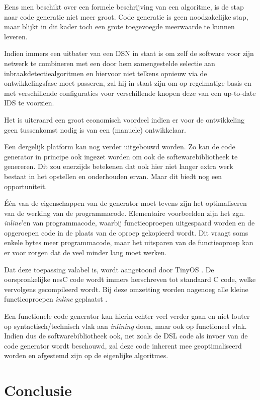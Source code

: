 Eens men beschikt over een formele beschrijving van een algoritme, is de stap
naar code generatie niet meer groot. Code generatie is geen noodzakelijke stap,
maar blijkt in dit kader toch een grote toegevoegde meerwaarde te kunnen
leveren.

Indien immers een uitbater van een DSN in staat is om zelf de software voor
zijn netwerk te combineren met een door hem samengestelde selectie aan
inbraakdetectiealgoritmen en hiervoor niet telkens opnieuw via de
ontwikkelingsfase moet passeren, zal hij in staat zijn om op regelmatige basis
en met verschillende configuraties voor verschillende knopen deze van een
up-to-date IDS te voorzien.

Het is uiteraard een groot economisch voordeel indien er voor de ontwikkeling
geen tussenkomst nodig is van een (manuele) ontwikkelaar.

Een dergelijk platform kan nog verder uitgebouwd worden. Zo kan de code
generator in principe ook ingezet worden om ook de softewarebibliotheek te
genereren. Dit zou enerzijds betekenen dat ook hier niet langer extra werk
bestaat in het opstellen en onderhouden ervan. Maar dit biedt nog een
opportuniteit.

\'E\'en van de eigenschappen van de generator moet tevens zijn het
optimaliseren van de werking van de programmacode. Elementaire voorbeelden zijn
het zgn. \emph{inline}'en van programmacode, waarbij functieoproepen
uitgespaard worden en de opgeroepen code in de plaats van de oproep gekopieerd
wordt. Dit vraagt soms enkele bytes meer programmacode, maar het uitsparen van
de functieoproep kan er voor zorgen dat de \mcu veel minder lang moet werken.

Dat deze toepassing valabel is, wordt aangetoond door TinyOS
\citep{levis2005tinyos}. De oorspronkelijke nesC code wordt immers herschreven
tot standaard C code, welke vervolgens gecompileerd wordt. Bij deze omzetting
worden nagenoeg alle kleine functieoproepen \emph{inline} geplaatst
\citep{gay2007software}.

Een functionele code generator kan hierin echter veel verder gaan en niet
louter op syntactisch/technisch vlak aan \emph{inlining} doen, maar ook op
functioneel vlak. Indien dus de softwarebibliotheek ook, net zoals de DSL code
als invoer van de code generator wordt beschouwd, zal deze code inherent mee
geoptimaliseerd worden en afgestemd zijn op de eigenlijke algoritmes.

\section{Conclusie}
\label{section:solution-conclusion}

